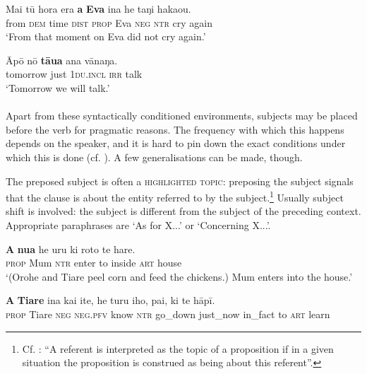 \ea\label{ex:8.69}
\gll Mai tū hora era \textbf{a} \textbf{Eva} {\ꞌ}ina he taŋi haka{\ꞌ}ou. \\
from \textsc{dem} time \textsc{dist} \textsc{prop} Eva \textsc{neg} \textsc{ntr} cry again \\

\glt 
‘From that moment on Eva did not cry again.’ \textstyleExampleref{[R210.137]} 
\z

\ea\label{ex:8.70}
\gll Āpō nō \textbf{tāua} ana vānaŋa. \\
tomorrow just \textsc{1du.incl} \textsc{irr} talk \\

\glt 
‘Tomorrow we will talk.’ \textstyleExampleref{[R304.014]} 
\z

\paragraph{}\label{sec:8.6.1.1.2} Apart from these syntactically conditioned environments, subjects may be placed before the verb for pragmatic reasons. The frequency with which this happens depends on the speaker, and it is hard to pin down the exact conditions under which this is done (cf. \citealt[77]{Dryer2007Word}). A few generalisations can be made, though.

The preposed subject is often a \textsc{highlighted topic}: preposing the subject signals that the clause is about the entity referred to by the subject.\footnote{\label{fn:422}Cf. \citet[131]{Lambrecht1994}: “A referent is interpreted as the topic of a proposition if in a given situation the proposition is construed as being about this referent”.} Usually subject shift is involved: the subject is different from the subject of the preceding context. Appropriate paraphrases are ‘As for X...’ or ‘Concerning X...’.

\ea\label{ex:8.71}
\gll \textbf{A} \textbf{nua} he uru ki roto te hare. \\
\textsc{prop} Mum \textsc{ntr} enter to inside \textsc{art} house \\

\glt 
‘(Orohe and Tiare peel corn and feed the chickens.) Mum enters into the house.’ \textstyleExampleref{[R184.071]} 
\z

\ea\label{ex:8.72}
\gll \textbf{A} \textbf{Tiare} {\ꞌ}ina kai {\ꞌ}ite, he turu iho, pa{\ꞌ}i, ki te hāpī. \\
\textsc{prop} Tiare \textsc{neg} \textsc{neg.pfv} know \textsc{ntr} go\_down just\_now in\_fact to \textsc{art} learn \\

